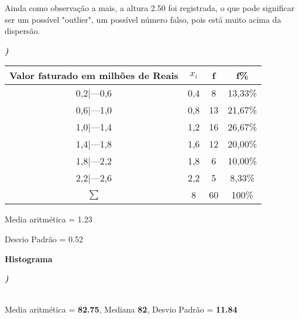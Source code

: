 \documentclass[12pt]{article}
\newcounter{instn}
\newcommand{\instnum}{\arabic{instn}}
\newcommand{\myline}[1]{
    \emph{\textbf{#1)}}
    \addtocounter{instn}{1}
}
\begin{document}
    Ainda como observação a mais, a altura 2.50 foi registrada, o que pode significar ser um possível
    "outlier", um possível número falso, pois está muito acima da dispersão.


    \newpage
    \myline{\instnum}

    \begin{center}
        \begin{tabular}{|c | c | c | c |} 
        \hline
        Valor faturado em milhões de Reais & $x_i$ & f & f\% \\ [3pt]
        \hline
        0,2|---0,6 & 0,4 & 8 & 13,33\% \\ 
        \hline
        0,6|---1,0 & 0,8 & 13 & 21,67\% \\
        \hline
        1,0|---1,4 & 1,2 & 16 & 26,67\% \\
        \hline
        1,4|---1,8 & 1,6 & 12 & 20,00\% \\
        \hline
        1,8|---2,2 & 1,8 & 6 & 10,00\% \\ 
        \hline
        2,2|---2,6 & 2,2 & 5 & 8,33\% \\ 
        \hline
        $\sum$ & 8 & 60 & 100\% \\ [3pt]
        \hline
       \end{tabular}
    \end{center}

    Media aritmética = 1.23 

    Desvio Padrão = 0.52

    \begin{center}
        \large \textbf{Histograma}
    \end{center}
    \begin{center}
    \end{center}

    \newpage
    
    \myline{\instnum} \\ Media aritmética = \textbf{82.75}, Mediana \textbf{82}, Desvio Padrão = \textbf{11.84}
\end{document}

